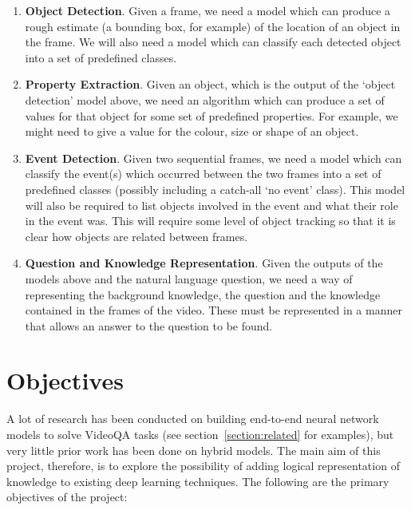 \documentclass[../interim.tex]{subfiles}
\begin{document}
\begin{enumerate}
  \item \textbf{Object Detection}. Given a frame, we need a model which can produce a rough estimate (a bounding box, for example) of the location of an object in the frame. We will also need a model which can classify each detected object into a set of predefined classes.

  \item \textbf{Property Extraction}. Given an object, which is the output of the `object detection' model above, we need an algorithm which can produce a set of values for that object for some set of predefined properties. For example, we might need to give a value for the colour, size or shape of an object.

  \item \textbf{Event Detection}. Given two sequential frames, we need a model which can classify the event(s) which occurred between the two frames into a set of predefined classes (possibly including a catch-all `no event' class). This model will also be required to list objects involved in the event and what their role in the event was. This will require some level of object tracking so that it is clear how objects are related between frames.

  \item \textbf{Question and Knowledge Representation}. Given the outputs of the models above and the natural language question, we need a way of representing the background knowledge, the question and the knowledge contained in the frames of the video. These must be represented in a manner that allows an answer to the question to be found.
\end{enumerate}


\section{Objectives}

A lot of research has been conducted on building end-to-end neural network models to solve VideoQA tasks (see section~\ref{section:related} for examples), but very little prior work has been done on hybrid models. The main aim of this project, therefore, is to explore the possibility of adding logical representation of knowledge to existing deep learning techniques. The following are the primary objectives of the project:
\end{document}
